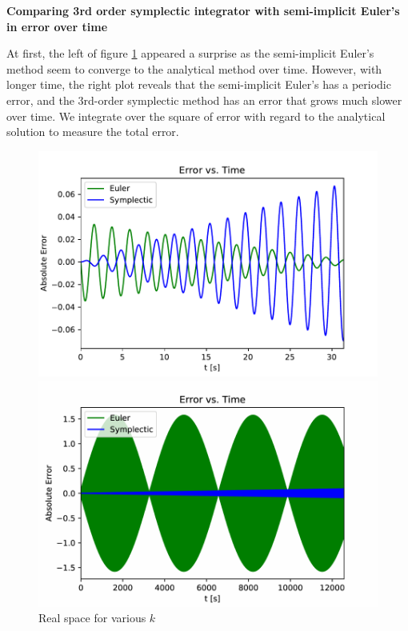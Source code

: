 \begin{problem}{3}
	\textbf{Comparing 3rd order symplectic integrator with semi-implicit Euler's in error over time}

  At first, the left of figure \ref{error} appeared a surprise as the
  semi-implicit Euler's method seem to converge to the analytical method over
  time. However, with longer time, the right plot reveals that the semi-implicit
  Euler's has a periodic error, and the 3rd-order symplectic method has an error
  that grows much slower over time. We integrate over the square of error with
  regard to the analytical solution to measure the total error.

\begin{figure}[ht!]
	\centering
	\begin{minipage}[b]{0.4\textwidth}
	  \includegraphics[scale=0.6]{../figures/error-10.pdf}
	\end{minipage}
	\hfill
	\begin{minipage}[b]{0.4\textwidth}
	  \includegraphics[scale=0.6]{../figures/error-4k.pdf}
	\end{minipage}
	\caption{Real space for various $k$}
  \label{error}
\end{figure}
\end{problem}
